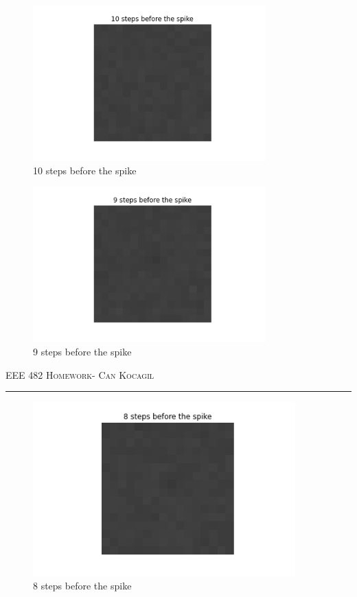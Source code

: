 \documentclass[12pt]{amsart}
\begin{document}
\begin{figure}[h]
    \centering
    \includegraphics[width = 0.8\textwidth]{images/10.png}
    \caption{10 steps before the spike}
\end{figure}


\begin{figure}[h]
    \centering
    \includegraphics[width = 0.8\textwidth]{images/9.png}
    \caption{9 steps before the spike}
\end{figure}

\newpage
{\scshape EEE 482} \hfill {\scshape \large  Homework-\relax} \hfill {\scshape Can Kocagil}
\smallskip
\hrule
\vspace{2mm}


\begin{figure}[h]
    \centering
    \includegraphics[width = 0.9\textwidth]{images/8.png}
    \caption{8 steps before the spike}
\end{figure}
\end{document}
